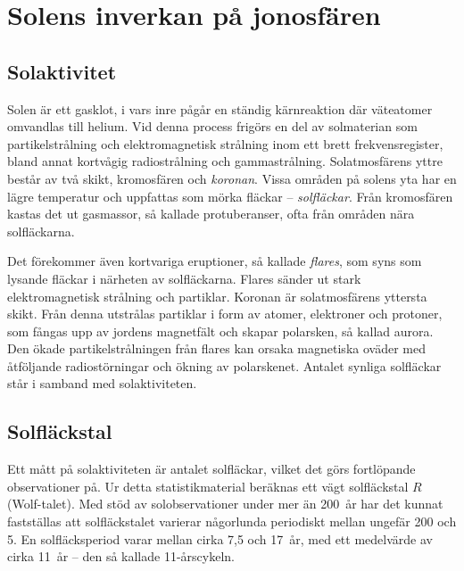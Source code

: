 \newpage %
\section[Solens inverkan]{Solens inverkan på jonosfären}
\label{solens_inverkan_jonosfären}

\subsection{Solaktivitet}

Solen är ett gasklot, i vars inre pågår en ständig kärnreaktion där
väteatomer omvandlas till helium.
Vid denna process frigörs en del av solmaterian som partikelstrålning och
elektromagnetisk strålning inom ett brett frekvensregister, bland annat
kortvågig radiostrålning och gammastrålning.
Solatmosfärens yttre består av två skikt, kromosfären och \emph{koronan}.
Vissa områden på solens yta har en lägre temperatur och uppfattas som mörka
fläckar -- \emph{solfläckar}.
Från kromosfären kastas det ut gasmassor, så kallade protuberanser, ofta från
områden nära solfläckarna.

Det förekommer även kortvariga eruptioner, så kallade \emph{flares}, som syns
som lysande fläckar i närheten av solfläckarna.
Flares sänder ut stark elektromagnetisk strålning och partiklar.
Koronan är solatmosfärens yttersta skikt.
Från denna utstrålas partiklar i form av atomer, elektroner och protoner, som
fångas upp av jordens magnetfält och skapar polarsken, så kallad aurora.
Den ökade partikelstrålningen från flares kan orsaka magnetiska oväder med
åtföljande radiostörningar och ökning av polarskenet.
Antalet synliga solfläckar står i samband med solaktiviteten.

\subsection{Solfläckstal}

Ett mått på solaktiviteten är antalet solfläckar, vilket det görs
fortlöpande observationer på.
Ur detta statistikmaterial beräknas ett vägt solfläckstal \(R\) (Wolf-talet).
Med stöd av solobservationer under mer än 200~år har det kunnat fastställas att
solfläckstalet varierar någorlunda periodiskt mellan ungefär 200 och 5.
En solfläcksperiod varar mellan cirka 7,5 och 17~år, med ett medelvärde
av cirka 11~år -- den så kallade 11-årscykeln.

